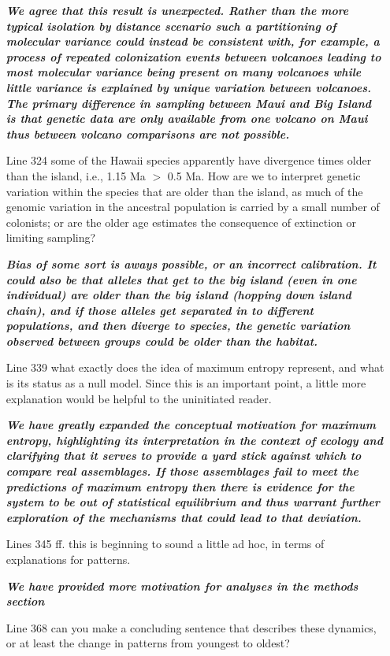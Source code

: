 \documentclass[12pt]{article}
\begin{document}
\begin{itemize}
  \textit{\textbf{We agree that this result is unexpected. Rather than
      the more typical isolation by distance scenario such a
      partitioning of molecular variance could instead be consistent
      with, for example, a process of repeated colonization events
      between volcanoes leading to most molecular variance being
      present on many volcanoes while little variance is explained by
      unique variation between volcanoes. The primary difference in
      sampling between Maui and Big Island is that genetic data are
      only available from one volcano on Maui thus between volcano
      comparisons are not possible. }}
%
\item[Line 324] some of the Hawaii species apparently have divergence
  times older than the island, i.e., 1.15 Ma $>$ 0.5 Ma. How are we to
  interpret genetic variation within the species that are older than
  the island, as much of the genomic variation in the ancestral
  population is carried by a small number of colonists; or are the
  older age estimates the consequence of extinction or limiting
  sampling?

  \textit{\textbf{Bias of some sort is aways possible, or an incorrect
      calibration.  It could also be that alleles that get to the big
      island (even in one individual) are older than the big island
      (hopping down island chain), and if those alleles get separated
      in to different populations, and then diverge to species, the
      genetic variation observed between groups could be older than
      the habitat.}}
%
\item[Line 339] what exactly does the idea of maximum entropy
  represent, and what is its status as a null model. Since this is an
  important point, a little more explanation would be helpful to the
  uninitiated reader.

  \textit{\textbf{We have greatly expanded the conceptual motivation
      for maximum entropy, highlighting its interpretation in the
      context of ecology and clarifying that it serves to provide a
      yard stick against which to compare real assemblages. If those
      assemblages fail to meet the predictions of maximum entropy then
      there is evidence for the system to be out of statistical
      equilibrium and thus warrant further exploration of the
      mechanisms that could lead to that deviation.}}
%
\item[Lines 345 ff.] this is beginning to sound a little ad hoc, in
  terms of explanations for patterns.

\textit{\textbf{We have provided more motivation for analyses in the
    methods section}}
%
\item[Line 368] can you make a concluding sentence that describes
  these dynamics, or at least the change in patterns from youngest to
  oldest?


\end{itemize}
\end{document}
